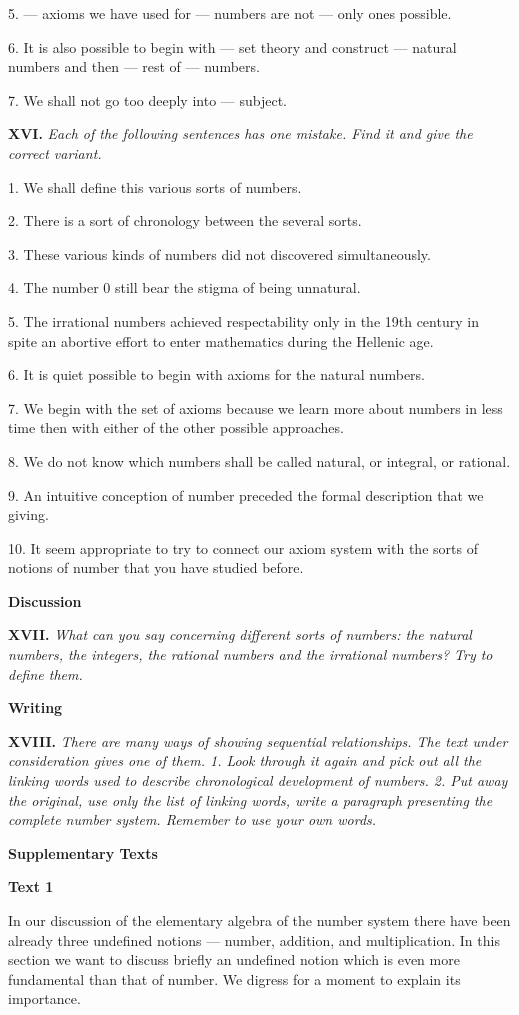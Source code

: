 \documentclass[a4paper]{article}
\newcommand{\ESect}[1]{\medskip\par{\large \textbf{#1}}\par}
\newcommand{\ETask}[2]{\medskip\par\textbf{#1.} \textit{#2}\par}
\begin{document}
5. --- axioms we have used for --- numbers are not --- only ones possible.

6. It is also possible to begin with --- set theory and construct --- natural numbers and then --- rest of --- numbers.

7. We shall not go too deeply into --- subject.

\ETask{XVI}{Each of the following sentences has one mistake. Find it and give the correct variant.}

1. We shall define this various sorts of numbers.

2. There is a sort of chronology between the several sorts.

3. These various kinds of numbers did not discovered simultaneously.

4. The number 0 still bear the stigma of being unnatural.

5. The irrational numbers achieved respectability only in the 19th century in spite an abortive effort to enter
mathematics during the Hellenic age.

6. It is quiet possible to begin with axioms for the natural numbers.

7. We begin with the set of axioms because we learn more about numbers in less time then with either of the other possible approaches.

8. We do not know which numbers shall be called natural, or integral, or rational.

9. An intuitive conception of number preceded the formal description that we giving.

10. It seem appropriate to try to connect our axiom system with the sorts of notions of number that you have studied before.

\ESect{Discussion}

\ETask{XVII}{What can you say concerning different sorts of numbers: the natural numbers, the integers, the rational numbers and
the irrational numbers? Try to define them.}

\ESect{Writing}
\ETask{XVIII}{There are many ways of showing sequential relationships. The text under consideration gives one of them.
1. Look through it again and pick out all the linking words used to describe chronological development of numbers.
2. Put away the original, use only the list of linking words, write a paragraph presenting the complete number system.
Remember to use your own words.}

\ESect{Supplementary Texts}
\ESect{Text 1}
In our discussion of the elementary algebra of the number system there have been already three undefined notions --- number,
addition, and multiplication. In this section we want to discuss briefly an undefined notion which is even more fundamental than
that of number. We digress for a moment to explain its importance.
\end{document}
